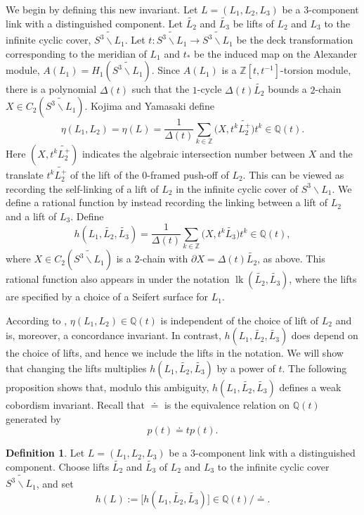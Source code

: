 \documentclass[a4paper, 11pt]{amsart}
\theoremstyle{definition}
\newtheorem{definition}[theorem]{Definition}
\newcommand{\Q}{\mathbb{Q}}
\newcommand{\Z}{\mathbb{Z}}
\newcommand{\Sum}{\displaystyle \sum}
\newcommand{\noteta}{h}
\begin{document}
We begin by defining this new invariant. Let $L=(L_1,L_2,L_3)$ be a $3$-component link with a distinguished component. Let $\widetilde{L_2}$ and $\widetilde{L_3}$  be lifts of $L_2$ and $L_3$ to the infinite cyclic cover, $\widetilde{S^3\smallsetminus L_1}$. Let $t\colon \widetilde{S^3\smallsetminus L_1}\to \widetilde{S^3\smallsetminus L_1}$ be the deck transformation corresponding to the meridian of $L_1$ and $t_*$ be the induced map on the Alexander module, $A(L_1) = H_1(\widetilde{S^3\smallsetminus L_1})$. Since $A(L_1)$ is a $\Z[t,t^{-1}]$-torsion module, there is a polynomial $\Delta(t)$ such that the $1$-cycle $\Delta(t) \widetilde{L_2}$ bounds a $2$-chain $X\in C_2(\widetilde{S^3\smallsetminus L_1})$. Kojima and Yamasaki define
$$
\eta(L_1, L_2)=\eta(L)=\dfrac{1}{\Delta(t)}\Sum_{k\in \Z} \bigl(X, t^k\widetilde{L_2^+}\bigr)t^k \in \Q(t).
$$
Here $(X, t^k\widetilde{L_2^+})$ indicates the algebraic intersection number between $X$ and the translate $t^k\widetilde{L_2^+}$ of the lift of the $0$-framed push-off of $L_2$. This can be viewed as recording the self-linking of a lift of $L_2$ in the infinite cyclic cover of $S^3\smallsetminus L_1$. We define a {rational function} by instead recording the linking between a lift of $L_2$ and a lift of $L_3$. Define
$$
\noteta(L_1,\widetilde{L_2},\widetilde{L_3})=\dfrac{1}{\Delta(t)}\Sum_{k\in \Z} \bigl(X, t^k\widetilde{L_3}\bigr)t^k\in \Q(t),
$$
where $X\in C_2(\widetilde{S^3\smallsetminus L_1})$ is a $2$-chain with $\partial X=\Delta(t) \widetilde{L_2}$, as above. {This rational function also appears in \cite{Tsukamoto-Yasuhara:2007} under the notation $\operatorname{lk}(\widetilde{L_2},\widetilde{L_3})$, where the lifts are specified by a choice of a Seifert surface for $L_1$.}

According to \cite[Theorem~2]{KojYam79}, \(\eta(L_1,L_2)\in \Q(t)\) is independent of the choice of lift of \(L_2\) and is, moreover, a concordance invariant. In contrast, \(\noteta(L_1,\widetilde{L_2},\widetilde{L_3})\) does depend on the choice of lifts, and hence we include the lifts in the notation.  We will show that changing the lifts multiplies \(\noteta(L_1,\widetilde{L_2},\widetilde{L_3})\) by a power of \(t\). The following proposition shows that, modulo this ambiguity, \(\noteta(L_1,\widetilde{L_2},\widetilde{L_3})\) defines a weak cobordism invariant. Recall that \(\doteq\) is the equivalence relation on \(\Q(t)\) generated by
\[
p(t)\doteq t p(t).
\]


\begin{definition}
Let $L=(L_1,L_2,L_3)$ be a $3$-component link with a distinguished component. Choose lifts
\(\widetilde{L_2}\) and \(\widetilde{L_3}\) of \(L_2\) and \(L_3\) to the infinite cyclic cover
\(\widetilde{S^3\smallsetminus L_1}\), and set
\[
h(L):=\big[\noteta(L_1,\widetilde{L_2},\widetilde{L_3})\big]\in \Q(t)/\doteq.
\]
\end{definition}
\end{document}
